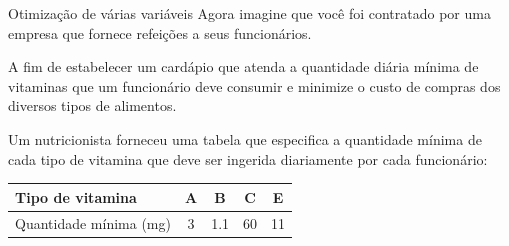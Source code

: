 \begin{frame}[label=introducao]

\begin{block}{Otimização de várias variáveis}
Agora imagine que você foi contratado por  uma empresa que fornece refeições a seus funcionários.
\smallskip

A fim de estabelecer um cardápio que atenda {\color{blue}a quantidade diária mínima de vitaminas} que um funcionário deve consumir  e {\color{red} minimize o custo de compras dos  diversos tipos de alimentos}.
\smallskip


Um nutricionista forneceu uma tabela que especifica a {\color{blue} quantidade mínima de cada tipo de vitamina que deve ser ingerida diariamente} por cada funcionário:
\end{block}

\begin{center}

\begin{tabu}{|l|c|c|c|c|}
\hline
Tipo de vitamina & A & B & C & E\\ \hline
	\rowfont{\color{blue}} Quantidade  mínima (mg) & 3 & 1.1 & 60 & 11\\ \hline
\end{tabu} 
\end{center}


\end{frame}

